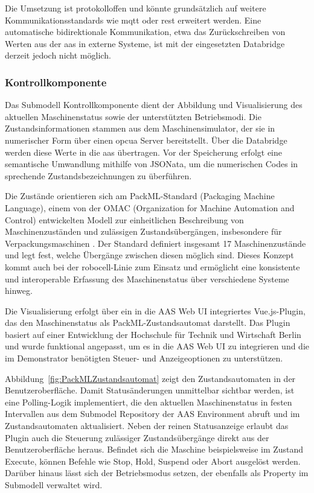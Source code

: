Die Umsetzung ist protokolloffen und könnte grundsätzlich auf weitere Kommunikationsstandards wie \acs{mqtt} oder \acs{rest} erweitert werden.
Eine automatische bidirektionale Kommunikation, etwa das Zurückschreiben von Werten aus der \acs{aas} in externe Systeme, ist mit der eingesetzten Databridge derzeit jedoch nicht möglich.

\subsubsection*{Kontrollkomponente}
\vspace{-0.5em}
Das Submodell Kontrollkomponente dient der Abbildung und Visualisierung des aktuellen Maschinenstatus sowie der unterstützten Betriebsmodi.
Die Zustandsinformationen stammen aus dem Maschinensimulator, der sie in numerischer Form über einen \acs{opcua} Server bereitstellt.
Über die Databridge werden diese Werte in die \acs{aas} übertragen.
Vor der Speicherung erfolgt eine semantische Umwandlung mithilfe von JSONata, um die numerischen Codes in sprechende Zustandsbezeichnungen zu überführen.

Die Zustände orientieren sich am PackML-Standard (Packaging Machine Language), einem von der OMAC (Organization for Machine Automation and Control) entwickelten Modell zur einheitlichen Beschreibung von Maschinenzuständen und zulässigen Zustandsübergängen, insbesondere für Verpackungsmaschinen \cite{OMAC}. 
Der Standard definiert insgesamt 17 Maschinenzustände und legt fest, welche Übergänge zwischen diesen möglich sind. 
Dieses Konzept kommt auch bei der robocell-Linie zum Einsatz und ermöglicht eine konsistente und interoperable Erfassung des Maschinenstatus über verschiedene Systeme hinweg.

Die Visualisierung erfolgt über ein in die AAS Web UI integriertes Vue.js-Plugin, das den Maschinenstatus als PackML-Zustandsautomat darstellt.
Das Plugin basiert auf einer Entwicklung der Hochschule für Technik und Wirtschaft Berlin \cite{HTW1, HTW2} und wurde funktional angepasst, um es in die AAS Web UI zu integrieren und die im Demonstrator benötigten Steuer- und Anzeigeoptionen zu unterstützen.

Abbildung~\ref{fig:PackMLZustandsautomat} zeigt den Zustandsautomaten in der Benutzeroberfläche.
Damit Statusänderungen unmittelbar sichtbar werden, ist eine Polling-Logik implementiert, die den aktuellen Maschinenstatus in festen Intervallen aus dem Submodel Repository der AAS Environment abruft und im Zustandsautomaten aktualisiert.
Neben der reinen Statusanzeige erlaubt das Plugin auch die Steuerung zulässiger Zustandsübergänge direkt aus der Benutzeroberfläche heraus.
Befindet sich die Maschine beispielsweise im Zustand Execute, können Befehle wie Stop, Hold, Suspend oder Abort ausgelöst werden.
Darüber hinaus lässt sich der Betriebsmodus setzen, der ebenfalls als Property im Submodell verwaltet wird.

